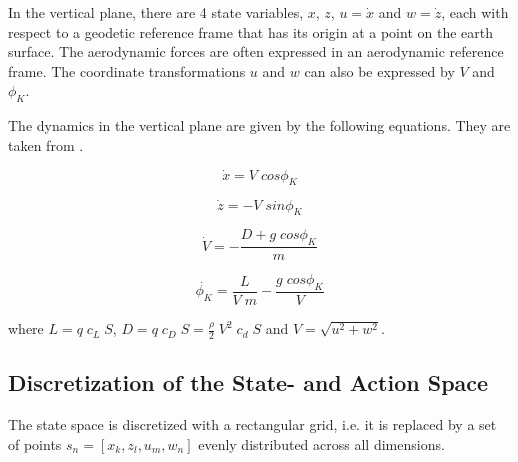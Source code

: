 In the vertical plane, there are 4 state variables, $x$, $z$, $u=\dot{x}$ and $w=\dot{z}$, each with respect to a geodetic reference frame that has its origin at a point on the earth surface. The aerodynamic forces are often expressed in an aerodynamic reference frame. The coordinate transformations $u$ and $w$ can also be expressed by $V$ and $\phi_K$.

The dynamics in the vertical plane are given by the following equations. They are taken from \cite{Fichter2009}. 

\begin{equation}
\dot{x} = V \; cos\phi_K
\end{equation}

\begin{equation}
\dot{z} = - V \; sin\phi_K
\end{equation}

\begin{equation}
\dot{V} = -\frac{D + g \; cos\phi_K}{m}
\end{equation}

\begin{equation}
\dot{\phi_K} = \frac{L}{V \; m} - \frac{g \; cos{\phi_K}}{V} 
\label{eq:dotgamma}
\end{equation}

where $L = q \; c_L \; S$, $D = q \; c_D \; S = \frac{\rho}{2} \; V^2 \; c_d \; S$ and $V=\sqrt{u^2+w^2}$.

\subsection{Discretization of the State- and Action Space}
\label{sec:disc2d}
The state space is discretized with a rectangular grid, i.e. it is replaced by a set of points $s_n=[x_k,z_l,u_m,w_n]$ evenly distributed across all dimensions.

